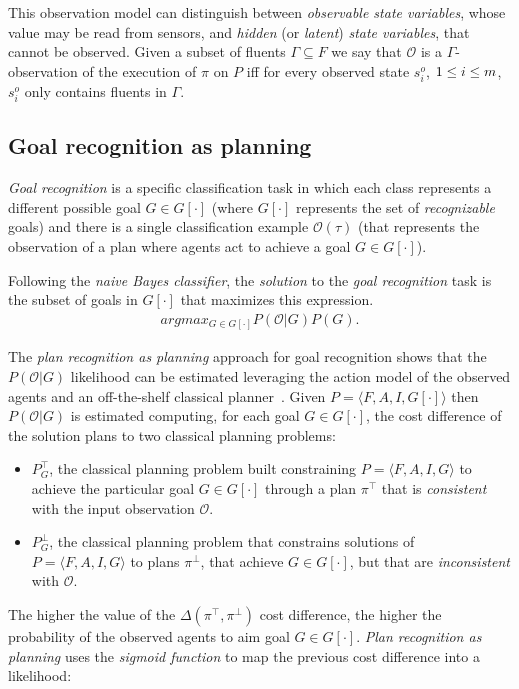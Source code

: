\documentclass[letterpaper]{article} %
\newcommand{\tup}[1]{{\langle #1 \rangle}}
\begin{document}
This observation model can distinguish between {\em observable state variables}, whose value may be read from sensors, and {\em hidden} (or {\em latent}) {\em state variables}, that cannot be observed. Given a subset of fluents $\Gamma\subseteq F$ we say that $\mathcal{O}$ is a $\Gamma$-observation of the execution of $\pi$ on $P$ iff for every observed state $s_i^o$, ${\small 1\leq i\leq m}$, $s_i^o$ only contains fluents in $\Gamma$.


\subsection{Goal recognition as planning}
{\em Goal recognition} is a specific classification task in which each class represents a different possible goal $G\in G[\cdot]$ (where $G[\cdot]$ represents the set of {\em recognizable} goals) and there is a single classification example $\mathcal{O}(\tau)$ (that represents the observation of a plan where agents act to achieve a goal $G\in G[\cdot]$).

Following the {\em naive Bayes classifier}, the {\em solution} to the {\em goal recognition} task is the subset of goals in $G[\cdot]$ that maximizes this expression.
\begin{align}
argmax_{G\in G[\cdot]} P(\mathcal{O}|G) P(G).
\end{align}

The {\em plan recognition as planning} approach for goal recognition shows that the $P(\mathcal{O}|G)$ likelihood can be estimated leveraging the action model of the observed agents and an off-the-shelf classical planner~\cite{ramirez2012plan}. Given $P=\tup{F,A,I,G[\cdot]}$ then $P(\mathcal{O}|G)$ is estimated computing, for each goal $G\in G[\cdot]$, the cost difference of the solution plans to two classical planning problems:
\begin{itemize}
\item $P^{\top}_G$, the classical planning problem built constraining $P=\tup{F,A,I,G}$ to achieve the particular goal $G\in G[\cdot]$ through a plan $\pi^\top$ that is {\em consistent} with the input observation $\mathcal{O}$.
\item $P^{\bot}_G$, the classical planning problem that constrains solutions of $P=\tup{F,A,I,G}$ to plans $\pi^\bot$, that achieve $G\in G[\cdot]$, but that are {\em inconsistent} with $\mathcal{O}$.
\end{itemize}

The higher the value of the $\Delta(\pi^\top,\pi^\bot)$ cost difference, the higher the probability of the observed agents to aim goal $G\in G[\cdot]$. {\em Plan recognition as planning} uses the {\em sigmoid function} to map the previous cost difference into a likelihood:
\end{document}
